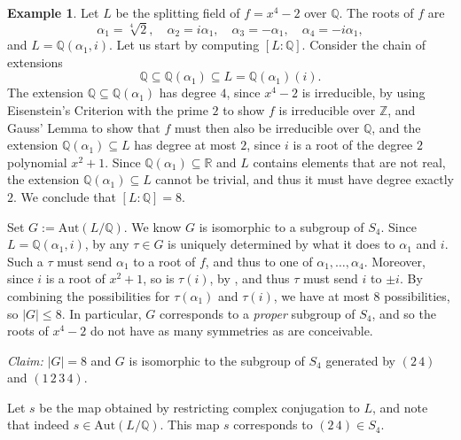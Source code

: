 \documentclass[12pt]{report}
\numberwithin{equation}{section}
\numberwithin{theorem}{chapter}
\theoremstyle{definition}
\newtheorem{example}[theorem]{Example}
\newtheorem*{basic properties}{Basic Properties}
\newtheorem*{Important Remark}{Important Remark}
\begin{document}
\begin{example}\label{example galois}
Let $L$ be the splitting field of $f = x^4-2$ over $\mathbb{Q}$. The roots of $f$ are 
$$\alpha_1 = \sqrt[4]{2}, \quad \alpha_2 = i \alpha_1, \quad \alpha_3 = - \alpha_1, \quad \alpha_4 = -i \alpha_1,$$
and $L = \mathbb{Q}(\alpha_1, i)$. Let us start by computing $[L:\mathbb{Q}]$. Consider the chain of extensions
$$\mathbb{Q} \subseteq \mathbb{Q}(\alpha_1) \subseteq L = \mathbb{Q}(\alpha_1)(i).$$
The extension $\mathbb{Q} \subseteq \mathbb{Q}(\alpha_1)$ has degree $4$, since $x^4 - 2$ is irreducible, by using Eisenstein's Criterion with the prime $2$ to show $f$ is irreducible over $\mathbb{Z}$, and Gauss' Lemma to show that $f$ must then also be irreducible over $\mathbb{Q}$, and the extension $\mathbb{Q}(\alpha_1) \subseteq L$ has degree at most $2$, since $i$ is a root of the degree $2$ polynomial $x^2+1$.
Since $\mathbb{Q}(\alpha_1) \subseteq \mathbb{R}$ and $L$ contains elements that are not real, the extension $\mathbb{Q}(\alpha_1) \subseteq L$ cannot be trivial, and thus it must have degree exactly $2$. We conclude that $[L:\mathbb{Q}] = 8$.



Set $G := \mathrm{Aut}(L/\mathbb{Q})$. We know $G$ is isomorphic to a subgroup of $S_4$. Since $L= \mathbb{Q}(\alpha_1, i)$, by  any $\tau \in G$ is uniquely determined by what it does to $\alpha_1$ and $i$. Such a $\tau$ must send $\alpha_1$ to a root of $f$, and thus to one of $\alpha_1, \ldots, \alpha_4$. Moreover, since $i$ is a root of $x^2 + 1$, so is $\tau(i)$, by , and thus $\tau$ must send $i$ to $\pm i$. By combining the possibilities for $\tau(\alpha_1)$ and $\tau(i)$, we have at most $8$ possibilities, so $|G| \leqslant 8$. In particular, $G$ corresponds to a {\em proper} subgroup of $S_4$, and so the roots of $x^4-2$ do not have as many symmetries as are conceivable.

{\em Claim:} $|G| = 8$ and $G$ is isomorphic to the subgroup of $S_4$ generated by $(2 \, 4)$ and $(1 \,2 \, 3 \,4)$. 

Let $s$ be the map obtained by restricting complex conjugation to $L$, and note that indeed $s \in \mathrm{Aut}(L/\mathbb{Q})$. This map $s$ corresponds to $(2 \, 4) \in S_4$.


\end{example}
\end{document}
